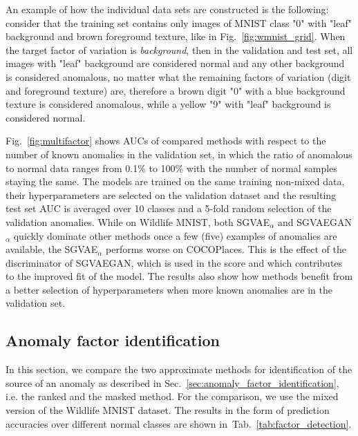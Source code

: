 An example of how the individual data sets are constructed is the following: consider that the training set contains only images of MNIST class "0" with "leaf" background and brown foreground texture, like in Fig.~\ref{fig:wmnist_grid}. When the target factor of variation is \textit{background}, then in the validation and test set, all images with "leaf" background are considered normal and any other background is considered anomalous, no matter what the remaining factors of variation (digit and foreground texture) are, therefore a brown digit "0" with a blue background texture is considered anomalous, while a yellow "9" with "leaf" background is considered normal.

Fig.~\ref{fig:multifactor} shows AUCs of compared methods with respect to the number of known anomalies in the validation set, in which the ratio of anomalous to normal data ranges from 0.1\% to 100\% with the number of normal samples staying the same. The models are trained on the same training non-mixed data, their hyperparameters are selected on the validation dataset and the resulting test set AUC is averaged over 10 classes and a 5-fold random selection of the validation anomalies. While on Wildlife MNIST, both SGVAE$_\alpha$ and SGVAEGAN$_\alpha$ quickly dominate other methods once a few (five) examples of anomalies are available, the SGVAE$_\alpha$ performs worse on COCOPlaces. This is the effect of the discriminator of SGVAEGAN, which is used in the score and which contributes to the improved fit of the model. The results also show how methods benefit from a better selection of hyperparameters when more known anomalies are in the validation set.

\subsection{Anomaly factor identification} \label{sec:anomaly_factor_identification_experiments}
In this section, we compare the two approximate methods for identification of the source of an anomaly as described in Sec.~\ref{sec:anomaly_factor_identification}, i.e. the ranked and the masked method. For the comparison, we use the mixed version of the Wildlife MNIST dataset. The results in the form of prediction accuracies over different normal classes are shown in~Tab.~\ref{tab:factor_detection}. 



